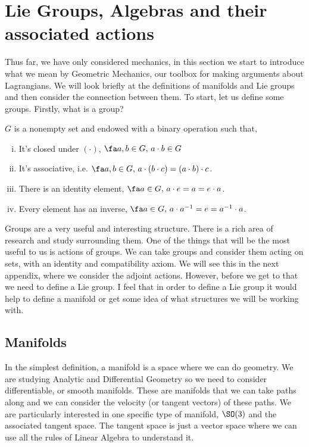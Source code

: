 
\section{Lie Groups, Algebras and their associated actions}

Thus far, we have only considered mechanics, in this section we start to introduce what we mean by Geometric Mechanics, our toolbox for making arguments about Lagrangians. We will look briefly at the definitions of manifolds and Lie groups and then consider the connection between them. To start, let us define some groups. Firstly, what is a group?
\begin{ndefi}[Group]
  $G$ is a nonempty set and endowed with a binary operation such that,
  \begin{enumerate}[(i)]
    \item It's closed under $(\cdot)$, $\fa a, b \in G,\, a \cdot b \in G$
    \item It's associative, i.e. $\fa a, b \in G,\,a \cdot ( b \cdot c) = (a \cdot b) \cdot c$.
    \item There is an identity element, $\fa a \in G,\, a \cdot e = a = e \cdot a$.
    \item Every element has an inverse, $\fa a \in G,\,a \cdot a^{-1} = e = a^{-1} \cdot a$.
  \end{enumerate}
\end{ndefi}

\noindent
Groups are a very useful and interesting structure. There is a rich area of research and study surrounding them. One of the things that will be the most useful to us is actions of groups. We can take groups and consider them acting on sets, with an identity and compatibility axiom. We will see this in the next appendix, where we consider the adjoint actions. However, before we get to that we need to define a Lie group. I feel that in order to define a Lie group it would help to define a manifold or get some idea of what structures we will be working with.

\subsection{Manifolds}
In the simplest definition, a manifold is a space where we can do geometry. We are studying Analytic and Differential Geometry so we need to consider differentiable, or smooth manifolds. These are manifolds that we can take paths along and we can consider the velocity (or tangent vectors) of these paths. We are particularly interested in one specific type of manifold, $\SO(3)$ and the associated tangent space. The tangent space is just a vector space where we can use all the rules of Linear Algebra to understand it. \\

